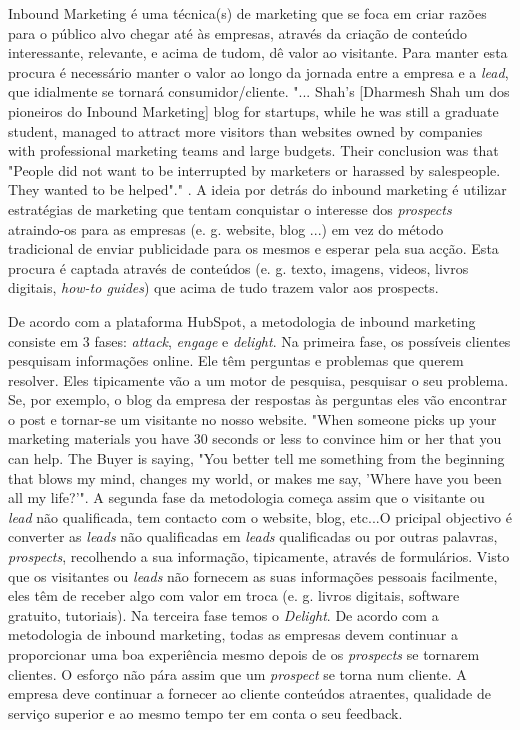Inbound Marketing é uma técnica(s) de marketing que se foca em criar razões para o público alvo chegar até às empresas, através da criação de conteúdo interessante, relevante, e acima de tudom, dê valor ao visitante. Para manter esta procura é necessário manter o valor ao longo da jornada entre a empresa e a \textit{\gls{lead}}, que idialmente se tornará consumidor/cliente. "... Shah’s [Dharmesh Shah um dos pioneiros do Inbound Marketing] blog for startups, while he was still a graduate student, managed to attract more visitors than websites owned by companies with professional marketing teams and large budgets. Their conclusion was that "People did not want to be interrupted by marketers or harassed by salespeople. They wanted to be helped"."\cite{inbound_paper} . A ideia por detrás do inbound marketing é utilizar estratégias de marketing que tentam conquistar o interesse dos \textit{\gls{prospects}} atraindo-os para as empresas (e. g. website, blog ...) em vez do método tradicional de enviar publicidade para os mesmos e esperar pela sua acção. Esta procura é captada através de conteúdos (e. g. texto, imagens, videos, livros digitais, \textit{how-to guides}) que acima de tudo trazem valor aos \gls{prospects}.

De acordo com a plataforma HubSpot\cite{HubSpot}, a metodologia de inbound marketing consiste em 3 fases: \textit{attack}, \textit{engage} e \textit{delight}. Na primeira fase, os possíveis clientes pesquisam informações online. Ele têm perguntas e problemas que querem resolver. Eles tipicamente vão a um motor de pesquisa, pesquisar o seu problema. Se, por exemplo, o blog da empresa der respostas às perguntas eles vão encontrar o post e tornar-se um visitante no nosso website.
 "When someone picks up your marketing materials you have 30 seconds or less to convince him or her that you can help. The Buyer is saying, "You better tell me something from the beginning that blows my mind, changes my world, or makes me say, 'Where have you been all my life?'"\cite{pbr}. 
A segunda fase da metodologia começa assim que o visitante ou \textit{lead} não qualificada, tem contacto com o website, blog, etc...O pricipal objectivo é converter as \textit{leads} não qualificadas em \textit{leads} qualificadas ou por outras palavras, \textit{prospects}, recolhendo a sua informação, tipicamente, através de formulários. Visto que os visitantes ou \textit{leads} não fornecem as suas informações pessoais facilmente, eles têm de receber algo com valor em troca (e. g. livros digitais, software gratuito, tutoriais). 
Na terceira fase temos o \textit{Delight}. De acordo com a metodologia de inbound marketing, todas as empresas devem continuar a proporcionar uma boa experiência mesmo depois de os \textit{prospects} se tornarem clientes. O esforço não pára assim que um \textit{prospect} se torna num cliente. A empresa deve continuar a fornecer ao cliente conteúdos atraentes, qualidade de serviço superior e ao mesmo tempo ter em conta o seu feedback. 

